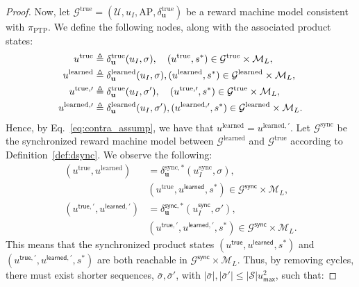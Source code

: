 \documentclass[letterpaper, 10 pt, conference]{ieeeconf}
\newcommand{\ptp}{\pi_{\mathrm{PTP}}}
\begin{document}
\begin{proof}
Now, let $\mathcal{G}^{\mathrm{true}}= (\mathcal{U}, u_I, \mathrm{AP}, \delta_{\textbf{u}}^{\mathrm{true}})$ be a reward machine model consistent with $\ptp$. We define the following nodes, along with the associated product states:
\begin{align}
    u^{\mathrm{true}} &\triangleq  \delta_{\textbf{u}}^{\mathrm{true}} (u_I, \sigma), \quad  (u^{\mathrm{true}},s^*) \in \mathcal{G}^{\mathrm{true}}\times \mathcal{M}_L, \notag \\
    u^{\mathrm{learned}} &\triangleq  \delta_{\textbf{u}}^{\mathrm{learned}} (u_I, \sigma),  (u^{\mathrm{learned}},s^*) \in \mathcal{G}^{\mathrm{learned}}\times \mathcal{M}_L, \notag\\
    u^{\mathrm{true},\prime} &\triangleq  \delta_{\textbf{u}}^{\mathrm{true}} (u_I, \sigma'), \quad  (u^{\mathrm{true},\prime},s^*) \in \mathcal{G}^{\mathrm{true}}\times \mathcal{M}_L,\notag \\
    u^{\mathrm{learned},\prime} &\triangleq  \delta_{\textbf{u}}^{\mathrm{learned}} (u_I, \sigma'),  (u^{\mathrm{learned},\prime},s^*) \in \mathcal{G}^{\mathrm{learned}}\times \mathcal{M}_L. \notag
\end{align}
Hence, by Eq.~\eqref{eq:contra_assump},  we have that $u^{\mathrm{learned}} = u^{\mathrm{learned},\prime}$.
Let $\mathcal{G}^{\mathrm{sync}}$ be the synchronized reward machine model between $\mathcal{G}^{\mathrm{learned}}$ and $\mathcal{G}^{\mathrm{true}}$ according to Definition~\ref{def:dsync}. We observe the following:
\begin{align*}
    (u^{\mathrm{true}}, u^{\mathrm{learned}}) &= \delta_{\mathbf{u}}^{\mathrm{sync}, *}(u_I^{\mathrm{sync}}, \sigma), \\
    &(u^{\mathrm{true}}, u^{\textsf{learned}},s^*) \in \mathcal{G}^{\textsf{sync}}\times \mathcal{M}_L,\\
    (u^{\textsf{true},\prime}, u^{\textsf{learned},\prime}) &= \delta_{\mathbf{u}}^{\textsf{sync}, *}(u_I^{\textsf{sync}}, \sigma'), \\
    &(u^{\textsf{true},\prime}, u^{\textsf{learned},\prime},s^*) \in \mathcal{G}^{\textsf{sync}}\times \mathcal{M}_L.
\end{align*}
This means that the synchronized product states $ (u^{\textsf{true}}, u^{\textsf{learned}},s^*)$ and $(u^{\textsf{true},\prime}, u^{\textsf{learned},\prime},s^*)$ are both reachable in $\mathcal{G}^{\textsf{sync}} \times \mathcal{M}_L$. Thus, by removing cycles, there must exist shorter sequences, $\bar \sigma, \bar \sigma'$, with $|\bar \sigma|,|\bar \sigma'|\leq |\mathcal{S}|u_{\textsf{max}}^2$, such that: 

\end{proof}
\end{document}

